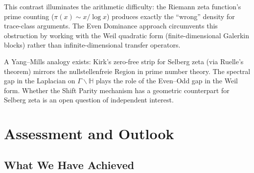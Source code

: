 \documentclass[12pt,a4paper]{article}
\theoremstyle{definition}
\theoremstyle{remark}
\begin{document}
This contrast illuminates the arithmetic difficulty: the Riemann zeta function's prime counting ($\pi(x) \sim x/\log x$) produces exactly the ``wrong'' density for trace-class arguments. The Even Dominance approach circumvents this obstruction by working with the Weil quadratic form (finite-dimensional Galerkin blocks) rather than infinite-dimensional transfer operators.

A Yang--Mills analogy exists: Kirk's zero-free strip for Selberg zeta (via Ruelle's theorem) mirrors the nullstellenfreie Region in prime number theory. The spectral gap in the Laplacian on $\Gamma \backslash \mathbb{H}$ plays the role of the Even--Odd gap in the Weil form. Whether the Shift Parity mechanism has a geometric counterpart for Selberg zeta is an open question of independent interest.


\section{Assessment and Outlook}
\label{sec:outlook}

\subsection{What We Have Achieved}
\end{document}
